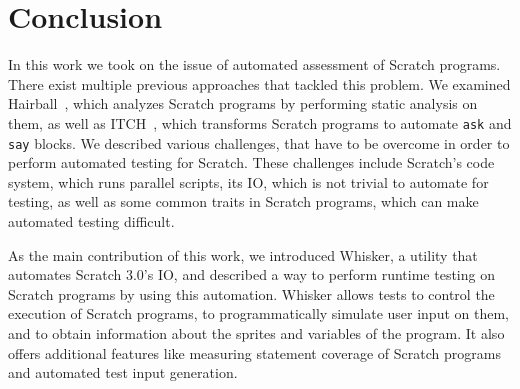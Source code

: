 \chapter{Conclusion}
\label{cha:conclusion}


In this work we took on the issue of automated assessment of Scratch programs.
There exist multiple previous approaches that tackled this problem.
We examined Hairball~\cite{hairball}, which analyzes Scratch programs by performing static analysis on them,
as well as ITCH~\cite{itch}, which transforms Scratch programs to automate \texttt{ask} and \texttt{say} blocks.
We described various challenges, that have to be overcome in order to perform automated testing for Scratch.
These challenges include Scratch's code system, which runs parallel scripts, its IO, which is not trivial to automate for testing,
as well as some common traits in Scratch programs, which can make automated testing difficult.
\parspace

As the main contribution of this work, we introduced Whisker, a utility that automates Scratch 3.0's IO,
and described a way to perform runtime testing on Scratch programs by using this automation.
Whisker allows tests to control the execution of Scratch programs,
to programmatically simulate user input on them,
and to obtain information about the sprites and variables of the program.
It also offers additional features like measuring statement coverage of Scratch programs
and automated test input generation.
\parspace


